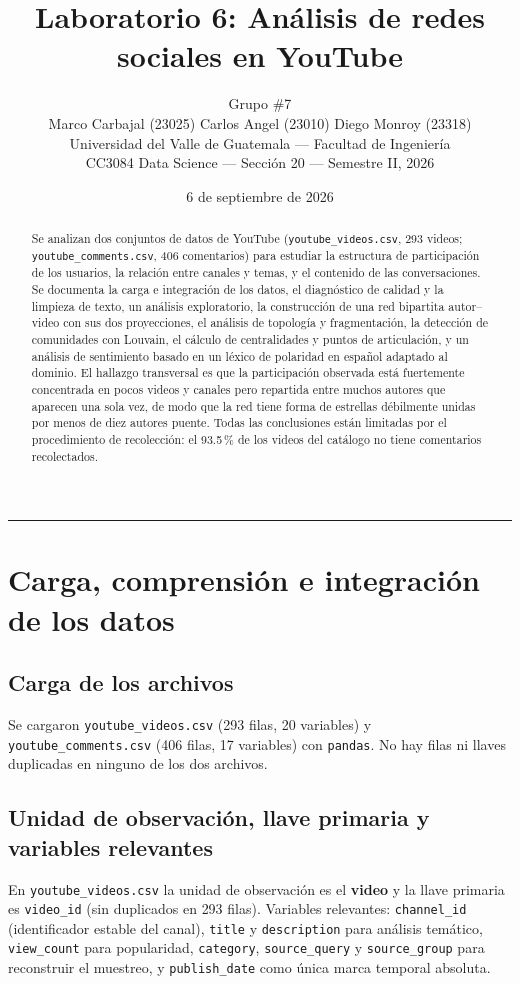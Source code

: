 \documentclass[11pt,a4paper]{article}
\title{\vspace{-1.5cm}\textbf{Laboratorio 6: An\'alisis de redes sociales en YouTube}}
\author{Grupo \#7 \\[2pt]
Marco Carbajal (23025) \quad Carlos Angel (23010) \quad Diego Monroy (23318)\\[4pt]
\small Universidad del Valle de Guatemala --- Facultad de Ingenier\'ia\\
\small CC3084 Data Science --- Secci\'on 20 --- Semestre II, 2026}
\date{6 de septiembre de 2026}
\begin{document}
\maketitle

\begin{abstract}
\noindent Se analizan dos conjuntos de datos de YouTube (\texttt{youtube\_videos.csv}, 293 videos;
\texttt{youtube\_comments.csv}, 406 comentarios) para estudiar la estructura de participaci\'on de los
usuarios, la relaci\'on entre canales y temas, y el contenido de las conversaciones. Se documenta la
carga e integraci\'on de los datos, el diagn\'ostico de calidad y la limpieza de texto, un an\'alisis
exploratorio, la construcci\'on de una red bipartita autor--video con sus dos proyecciones, el an\'alisis
de topolog\'ia y fragmentaci\'on, la detecci\'on de comunidades con Louvain, el c\'alculo de centralidades
y puntos de articulaci\'on, y un an\'alisis de sentimiento basado en un l\'exico de polaridad en espa\~nol
adaptado al dominio. El hallazgo transversal es que la participaci\'on observada est\'a fuertemente
concentrada en pocos videos y canales pero repartida entre muchos autores que aparecen una sola vez,
de modo que la red tiene forma de estrellas d\'ebilmente unidas por menos de diez autores puente. Todas
las conclusiones est\'an limitadas por el procedimiento de recolecci\'on: el 93.5\,\% de los videos del
cat\'alogo no tiene comentarios recolectados.
\end{abstract}

\tableofcontents
\bigskip
\hrule

\section{Carga, comprensi\'on e integraci\'on de los datos}

\subsection{Carga de los archivos}
Se cargaron \texttt{youtube\_videos.csv} (293 filas, 20 variables) y \texttt{youtube\_comments.csv}
(406 filas, 17 variables) con \texttt{pandas}. No hay filas ni llaves duplicadas en ninguno de los dos
archivos.

\subsection{Unidad de observaci\'on, llave primaria y variables relevantes}
En \texttt{youtube\_videos.csv} la unidad de observaci\'on es el \textbf{video} y la llave primaria es
\texttt{video\_id} (sin duplicados en 293 filas). Variables relevantes: \texttt{channel\_id}
(identificador estable del canal), \texttt{title} y \texttt{description} para an\'alisis tem\'atico,
\texttt{view\_count} para popularidad, \texttt{category}, \texttt{source\_query} y \texttt{source\_group}
para reconstruir el muestreo, y \texttt{publish\_date} como \'unica marca temporal absoluta.
\end{document}
